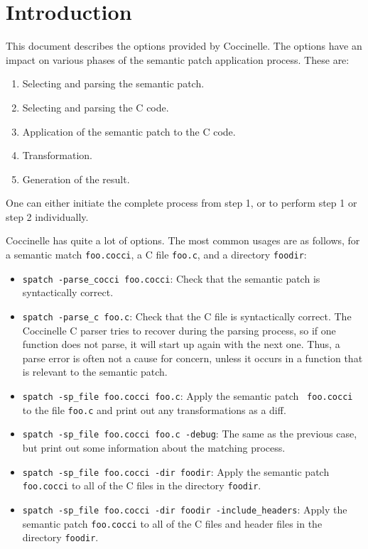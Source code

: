 \section{Introduction}

This document describes the options provided by Coccinelle.  The options
have an impact on various phases of the semantic patch application
process.  These are:

\begin{enumerate}
\item Selecting and parsing the semantic patch.
\item Selecting and parsing the C code.
\item Application of the semantic patch to the C code.
\item Transformation.
\item Generation of the result.
\end{enumerate}

\noindent
One can either initiate the complete process from step 1, or
to perform step 1 or step 2 individually.

Coccinelle has quite a lot of options.  The most common usages are as
follows, for a semantic match {\tt foo.cocci}, a C file {\tt foo.c}, and a
directory {\tt foodir}:

\begin{itemize}
\item {\tt spatch -parse\_cocci foo.cocci}: Check that the semantic patch
  is syntactically correct.
\item {\tt spatch -parse\_c foo.c}: Check that the C file
  is syntactically correct.  The Coccinelle C parser tries to recover
  during the parsing process, so if one function does not parse, it will
  start up again with the next one.  Thus, a parse error is often not a
  cause for concern, unless it occurs in a function that is relevant to the
  semantic patch.
\item {\tt spatch -sp\_file foo.cocci foo.c}: Apply the semantic patch {\tt
    foo.cocci} to the file {\tt foo.c} and print out any transformations as a
  diff.
\item {\tt spatch -sp\_file foo.cocci foo.c -debug}:  The same as the
  previous case, but print out some information about the matching process.
\item {\tt spatch -sp\_file foo.cocci -dir foodir}:  Apply the semantic
  patch {\tt foo.cocci} to all of the C files in the directory {\tt foodir}.
\item {\tt spatch -sp\_file foo.cocci -dir foodir -include\_headers}:  Apply
  the semantic patch {\tt foo.cocci} to all of the C files and header files
  in the directory {\tt foodir}. 
\end{itemize}

